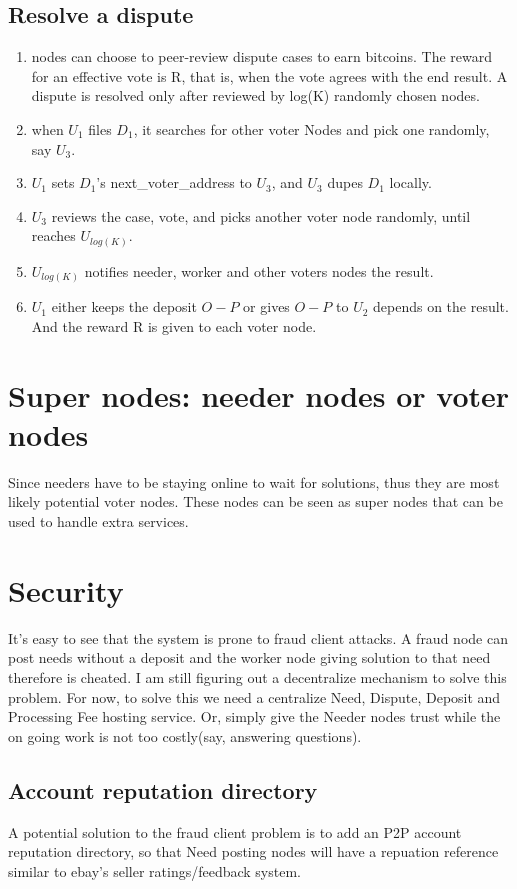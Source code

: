 \documentclass[12pt]{article}
\begin{document}
\subsection{Resolve a dispute}
\begin{enumerate}
	\item nodes can choose to peer-review dispute cases to earn bitcoins. The reward for an effective vote is R, that is, when the vote agrees with the end result. A dispute is resolved only after reviewed by log(K) randomly chosen nodes.
	\item when $U_1$ files $D_1$, it searches for other voter Nodes and pick one randomly, say $U_3$. 
	\item $U_1$ sets $D_1$'s next\_voter\_address to $U_3$, and $U_3$ dupes $D_1$ locally. 
	\item $U_3$ reviews the case, vote, and picks another voter node randomly, until reaches $U_{log(K)}$.
	\item $U_{log(K)}$ notifies needer, worker and other voters nodes the result.
	\item $U_1$ either keeps the deposit $O-P$ or gives $O-P$ to $U_2$ depends on the result. And the reward R is given to each voter node.
\end{enumerate}

\section{Super nodes: needer nodes or voter nodes}
Since needers have to be staying online to wait for solutions, thus they are most likely potential voter nodes. These nodes can be seen as super nodes that can be used to handle extra services.

\section{Security}
It's easy to see that the system is prone to fraud client attacks. A fraud node can post needs without a deposit and the worker node giving solution to that need therefore is cheated. I am still figuring out a decentralize mechanism to solve this problem. For now, to solve this we need a centralize Need, Dispute, Deposit and Processing Fee hosting service. Or, simply give the Needer nodes trust while the on going work is not too costly(say, answering questions).

\subsection{Account reputation directory}
A potential solution to the fraud client problem is to add an P2P account reputation directory, so that Need posting nodes will have a repuation reference similar to ebay's seller ratings/feedback system.

\begin{thebibliography}{9}
\end{thebibliography}

	
\end{document}
